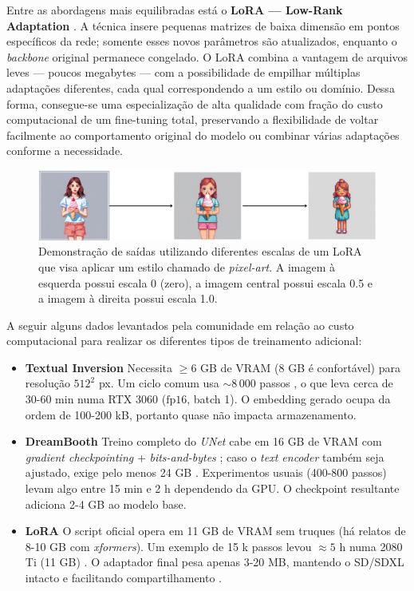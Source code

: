 \documentclass[12pt, %
openright, 
oneside, %
a4paper,    %
brazil]{facom-ufu-abntex2}
\begin{document}
Entre as abordagens mais equilibradas está o \textbf{LoRA — Low-Rank Adaptation} \cite{hu2021loralowrankadaptationlarge}. A técnica insere pequenas matrizes de baixa dimensão em pontos específicos da rede; somente esses novos parâmetros são atualizados, enquanto o \emph{backbone} original permanece congelado. O LoRA combina a vantagem de arquivos leves — poucos megabytes — com a possibilidade de empilhar múltiplas adaptações diferentes, cada qual correspondendo a um estilo ou domínio. Dessa forma, consegue-se uma especialização de alta qualidade com fração do custo computacional de um fine-tuning total, preservando a flexibilidade de voltar facilmente ao comportamento original do modelo ou combinar várias adaptações conforme a necessidade.

\begin{figure}[H]
    \centering
    \includegraphics[width=\linewidth]{finetuning-2.png}
    \caption{Demonstração de saídas utilizando diferentes escalas de um LoRA que visa aplicar um estilo chamado de \textit{pixel-art}. A imagem à esquerda possui escala 0 (zero), a imagem central possui escala 0.5 e a imagem à direita possui escala 1.0.}
    \label{fig:finetuning2}
\end{figure}

A seguir alguns dados levantados pela comunidade em relação ao custo computacional para realizar os diferentes tipos de treinamento adicional:
\begin{itemize}
      \item \textbf{Textual Inversion} Necessita \(\ge\!6\) GB de VRAM (8 GB é confortável) para resolução \(512^2\) px. Um ciclo comum usa \(\sim\!8\,000\) passos , o que leva cerca de 30-60 min numa RTX 3060 (\(\text{fp16}\), batch 1). O embedding gerado ocupa da ordem de 100-200 kB, portanto quase não impacta armazenamento.
      \item \textbf{DreamBooth} Treino completo do \textit{UNet} cabe em 16 GB de VRAM com \textit{gradient checkpointing} + \textit{bits-and-bytes} ; caso o \textit{text encoder} também seja ajustado, exige pelo menos 24 GB . Experimentos usuais (400-800 passos) levam algo entre 15 min e 2 h dependendo da GPU. O checkpoint resultante adiciona 2-4 GB ao modelo base.
      \item \textbf{LoRA} O script oficial opera em 11 GB de VRAM sem truques  (há relatos de 8-10 GB com \textit{xformers}). Um exemplo de 15 k passos levou \(\approx5\) h numa 2080 Ti (11 GB) . O adaptador final pesa apenas 3-20 MB, mantendo o SD/SDXL intacto e facilitando compartilhamento .
\end{itemize}
\end{document}
